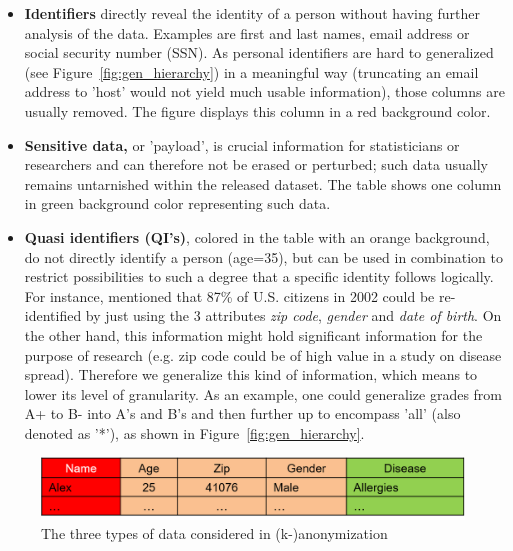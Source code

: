 \documentclass{llncs}
\begin{document}
\begin{itemize}
	\item \textbf{Identifiers} directly reveal the identity of a person without having further analysis of the data. Examples are first and last names, email address or social security number (SSN). As personal identifiers are hard to generalized (see Figure~\ref{fig:gen_hierarchy}) in a meaningful way (truncating an email address to 'host' would not yield much usable information), those columns are usually removed. The figure displays this column in a red background color.
	\item \textbf{Sensitive data,} or 'payload', is crucial information for statisticians or researchers and can therefore not be erased or perturbed; such data usually remains untarnished within the released dataset. The table shows one column in green background color representing such data.
	\item \textbf{Quasi identifiers (QI's)}, colored in the table with an orange background, do not directly identify a person (age=35), but can be used in combination to restrict possibilities to such a degree that a specific identity follows logically. For instance, \cite{sweeney2002k} mentioned that 87\% of U.S. citizens in 2002 could be re-identified by just using the 3 attributes \textit{zip code}, \textit{gender} and \textit{date of birth}. On the other hand, this information might hold significant information for the purpose of research (e.g. zip code could be of high value in a study on disease spread). Therefore we generalize this kind of information, which means to lower its level of granularity. As an example, one could generalize grades from A+ to B- into A's and B's and then further up to encompass 'all' (also denoted as '*'), as shown in Figure~\ref{fig:gen_hierarchy}.
\end{itemize}

\begin{figure}[H]
	\begin{center}
		\includegraphics[width=\textwidth]{figures/theory/3typesofdata}
		\caption{The three types of data considered in (k-)anonymization}
		\label{fig:anon_categories}
	\end{center}
\end{figure}
\end{document}

